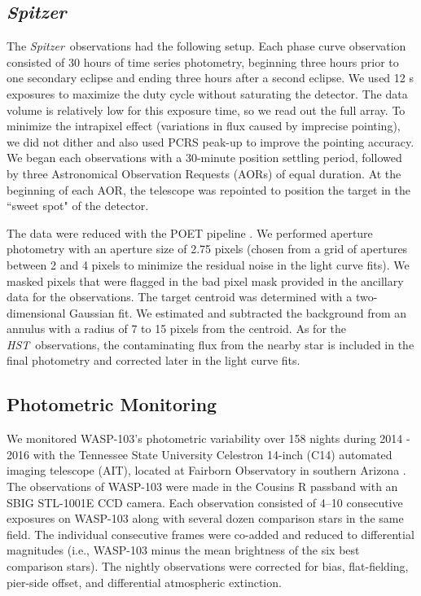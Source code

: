 \documentclass[twocolumn]{aastex61}
\newcommand{\project}[1]{\textsl{#1}}
\newcommand{\HST}{\project{HST}}
\newcommand{\Spitzer}{\project{Spitzer}}
\begin{document}
\subsection{\Spitzer}
The \Spitzer\ observations had the following setup. Each phase curve observation consisted of 30 hours of time series photometry, beginning three hours prior to one secondary eclipse and ending three hours after a second eclipse.  We used 12 s exposures to maximize the duty cycle without saturating the detector. The data volume is relatively low for this exposure time, so we read out the full array. To minimize the intrapixel effect (variations in flux caused by imprecise pointing), we did not dither and also used PCRS peak-up to improve the pointing accuracy. We began each observations with a 30-minute position settling period, followed by three Astronomical Observation Requests (AORs) of equal duration. At the beginning of each AOR, the telescope was repointed to position the target in the ``sweet spot" of the detector.

The data were reduced with the POET pipeline \citep{stevenson12}. We performed aperture photometry with an aperture size of 2.75 pixels (chosen from a grid of apertures between 2 and 4 pixels to minimize the residual noise in the light curve fits). We masked pixels that were flagged in the bad pixel mask provided in the ancillary data for the observations. The target centroid was determined with a two-dimensional Gaussian fit.  We estimated and subtracted the background from an annulus with a radius of 7 to 15 pixels from the centroid. As for the \HST\ observations, the contaminating flux from the nearby star is included in the final photometry and corrected later in the light curve fits.


\subsection{Photometric Monitoring}
We monitored WASP-103's photometric variability over 158 nights during 2014 - 2016 with the Tennessee State University Celestron 14-inch (C14) automated imaging telescope (AIT), located at Fairborn Observatory in southern Arizona \citep[see, e.g.,][]{h1999, ehf2003}.  The observations of WASP-103 were made in the Cousins R passband with an SBIG STL-1001E CCD camera.  Each observation consisted of 4--10 consecutive exposures on WASP-103 along with several dozen comparison stars in the same field. The individual consecutive frames were co-added and reduced to differential magnitudes (i.e., WASP-103 minus the mean brightness of the six best comparison stars). The nightly observations were corrected for bias, flat-fielding, pier-side offset, and differential atmospheric extinction.  
\end{document}
